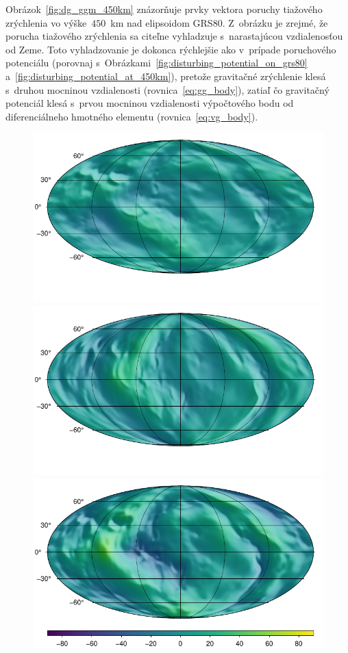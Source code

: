 \documentclass[a4paper, 12pt]{book}
\begin{document}
Obrázok~\ref{fig:dg_ggm_450km} znázorňuje prvky vektora poruchy tiažového 
zrýchlenia vo výške~$450$~km nad elipsoidom GRS80.  Z~obrázku je zrejmé, že 
porucha tiažového zrýchlenia sa citeľne vyhladzuje s~narastajúcou vzdialenosťou 
od Zeme.  Toto vyhladzovanie je dokonca rýchlejšie ako v~prípade poruchového 
potenciálu (porovnaj s~Obrázkami~\ref{fig:disturbing_potential_on_grs80} 
a~\ref{fig:disturbing_potential_at_450km}), pretože gravitačné zrýchlenie klesá 
s~druhou mocninou vzdialenosti (rovnica~\ref{eq:gg_body}), zatiaľ čo gravitačný 
potenciál klesá s~prvou mocninou vzdialenosti výpočtového bodu od 
diferenciálneho hmotného elementu (rovnica~\ref{eq:vg_body}).

\begin{figure}
\centering
\includegraphics{./fig-gravity-disturbance-at-450km-x.pdf}
\includegraphics{./fig-gravity-disturbance-at-450km-y.pdf}
\includegraphics{./fig-gravity-disturbance-at-450km-z.pdf}

\end{figure}
\end{document}
